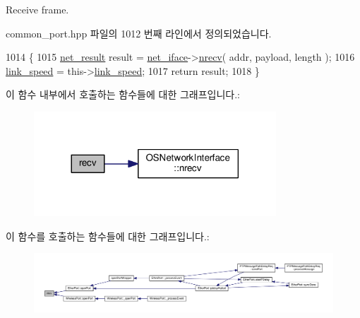 Receive frame. 



common\+\_\+port.\+hpp 파일의 1012 번째 라인에서 정의되었습니다.


\begin{DoxyCode}
1014     \{
1015         \hyperlink{avbts__osnet_8hpp_a21b2b4b5e479ef3adfc039ac30c961cd}{net\_result} result = \hyperlink{class_common_port_a7bc95d8cb3e95a8e7f9c5dc261289e37}{net\_iface}->\hyperlink{class_o_s_network_interface_a180931fa9d850cc342bc0ecd7b04e12a}{nrecv}( addr, payload, length );
1016         \hyperlink{class_common_port_aae24fc4f200e75aa8215f797b2561dbf}{link\_speed} = this->\hyperlink{class_common_port_aae24fc4f200e75aa8215f797b2561dbf}{link\_speed};
1017         \textcolor{keywordflow}{return} result;
1018     \}
\end{DoxyCode}


이 함수 내부에서 호출하는 함수들에 대한 그래프입니다.\+:
\nopagebreak
\begin{figure}[H]
\begin{center}
\leavevmode
\includegraphics[width=257pt]{class_common_port_a29eedafc1eb6f2ee041ea519b9a4f3c0_cgraph}
\end{center}
\end{figure}




이 함수를 호출하는 함수들에 대한 그래프입니다.\+:
\nopagebreak
\begin{figure}[H]
\begin{center}
\leavevmode
\includegraphics[width=350pt]{class_common_port_a29eedafc1eb6f2ee041ea519b9a4f3c0_icgraph}
\end{center}
\end{figure}


